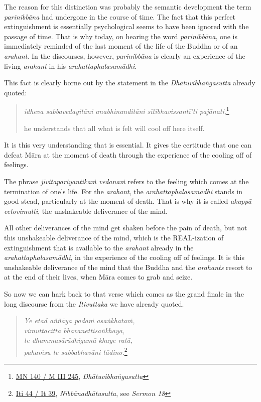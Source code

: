 The reason for this distinction was probably the semantic development the term \emph{parinibbāna} had undergone in the course of time. The fact that this perfect extinguishment is essentially psychological seems to have been ignored with the passage of time. That is why today, on hearing the word \emph{parinibbāna}, one is immediately reminded of the last moment of the life of the Buddha or of an \emph{arahant}. In the discourses, however, \emph{parinibbāna} is clearly an experience of the living \emph{arahant} in his \emph{arahattaphalasamādhi}.

This fact is clearly borne out by the statement in the \emph{Dhātuvibhaṅgasutta} already quoted:

\begin{quote}
\emph{idheva sabbavedayitāni anabhinanditāni sītībhavissantī'ti pajānati},\footnote{\href{https://suttacentral.net/mn140/pli/ms}{MN 140 / M III 245}, \emph{Dhātuvibhaṅgasutta}}

he understands that all what is felt will cool off here itself.
\end{quote}

It is this very understanding that is essential. It gives the certitude that one can defeat Māra at the moment of death through the experience of the cooling off of feelings.

The phrase \emph{jīvitapariyantikaṁ vedanaṁ} refers to the feeling which comes at the termination of one's life. For the \emph{arahant}, the \emph{arahattaphalasamādhi} stands in good stead, particularly at the moment of death. That is why it is called \emph{akuppā cetovimutti}, the unshakeable deliverance of the mind.

All other deliverances of the mind get shaken before the pain of death, but not this unshakeable deliverance of the mind, which is the REAL-ization of extinguishment that is available to the \emph{arahant} already in the \emph{arahattaphalasamādhi}, in the experience of the cooling off of feelings. It is this unshakeable deliverance of the mind that the Buddha and the \emph{arahants} resort to at the end of their lives, when Māra comes to grab and seize.

So now we can hark back to that verse which comes as the grand finale in the long discourse from the \emph{Itivuttaka} we have already quoted.

\begin{quote}
\emph{Ye etad aññāya padaṁ asaṅkhataṁ,}\\
\emph{vimuttacittā bhavanettisaṅkhayā,}\\
\emph{te dhammasārādhigamā khaye ratā,}\\
\emph{pahaṁsu te sabbabhavāni tādino.}\footnote{\href{https://suttacentral.net/iti44/pli/ms}{Iti 44 / It 39}, \emph{Nibbānadhātusutta}, see \emph{Sermon 18}}
\end{quote}

